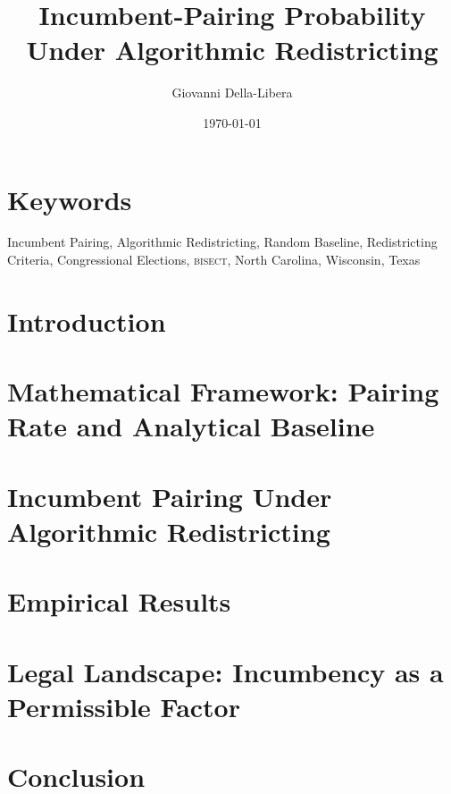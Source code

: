 \documentclass[12pt]{article}
\title{\textbf{Incumbent-Pairing Probability Under Algorithmic Redistricting}}
\author{Giovanni Della-Libera}
\date{\today}
\begin{document}
\maketitle

\begin{abstract}

\end{abstract}

\section*{Keywords}
Incumbent Pairing, Algorithmic Redistricting, Random Baseline, Redistricting Criteria,
Congressional Elections, \textsc{bisect}, North Carolina, Wisconsin, Texas

\section{Introduction}


\section{Mathematical Framework: Pairing Rate and Analytical Baseline}


\section{Incumbent Pairing Under Algorithmic Redistricting}


\section{Empirical Results}


\section{Legal Landscape: Incumbency as a Permissible Factor}


\section{Conclusion}




\end{document}
